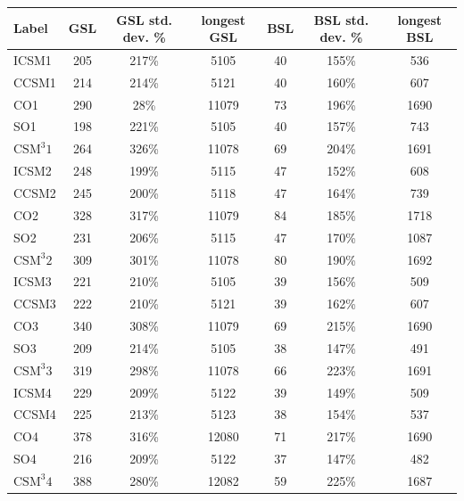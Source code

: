 \documentclass[12pt]{article}
\begin{document}
\begin{table}
  \begin{tabular}{| l | c | c | c | c | c | c |}\hline
    Label & GSL & GSL std. dev. \% & longest GSL & BSL & BSL std. dev. \% & longest BSL  \\\hline
    ICSM1 & 205 & 217\% & 5105 & 40 & 155\% & 536 \\\hline
    CCSM1 & 214 & 214\% & 5121 & 40 & 160\% & 607 \\\hline
    CO1 & 290 & 28\% & 11079 & 73 & 196\% & 1690 \\\hline
    SO1 & 198 & 221\% & 5105 & 40 & 157\% & 743 \\\hline
    $\text{CSM}^{3}1$ & 264 & 326\% & 11078 & 69 & 204\% & 1691 \\\hline\hline

    ICSM2 & 248 & 199\% & 5115 & 47 & 152\% & 608 \\\hline
    CCSM2 &245 & 200\% & 5118 & 47 & 164\% & 739 \\\hline
    CO2 & 328 & 317\% & 11079 & 84 & 185\% & 1718 \\\hline
    SO2 & 231 & 206\% & 5115 & 47 & 170\% & 1087 \\\hline
    $\text{CSM}^{3}2$ & 309 & 301\% & 11078 & 80 & 190\% & 1692 \\\hline\hline

    ICSM3 & 221 & 210\% & 5105 & 39 & 156\% & 509 \\\hline
    CCSM3 & 222 & 210\% & 5121 & 39 & 162\% & 607 \\\hline
    CO3 & 340 & 308\% & 11079 & 69 & 215\% & 1690 \\\hline
    SO3 & 209 & 214\% & 5105 & 38 & 147\% & 491 \\\hline
    $\text{CSM}^{3}3$ & 319 & 298\% & 11078 & 66 & 223\% & 1691 \\\hline\hline

    ICSM4 & 229 & 209\% & 5122 & 39 & 149\% & 509 \\\hline
    CCSM4 & 225 & 213\% & 5123 & 38 & 154\% & 537 \\\hline
    CO4 & 378 & 316\% & 12080 & 71 & 217\% & 1690 \\\hline
    SO4 & 216 & 209\% & 5122 & 37 & 147\% & 482 \\\hline
    $\text{CSM}^{3}4$ & 388 & 280\% & 12082 & 59 & 225\% & 1687 \\\hline\hline


\end{tabular}
\end{table}
\end{document}
